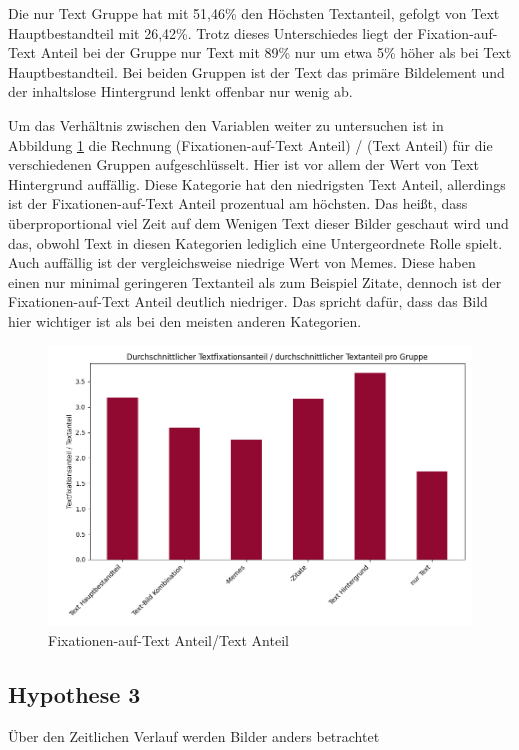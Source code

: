 \documentclass[
    language=german, %
    thesis=seminar, %
    supervisor=postdoc, %
    multiauthor=true, %
    ]{settings/csssa-thesis}
\begin{document}
Die nur Text Gruppe hat mit 51,46\% den Höchsten Textanteil, gefolgt von Text Hauptbestandteil 
mit 26,42\%. Trotz dieses Unterschiedes liegt der Fixation-auf-Text Anteil bei der Gruppe 
nur Text mit 89\% nur um etwa 5\% höher als bei Text Hauptbestandteil. Bei beiden Gruppen ist der 
Text das primäre Bildelement und der inhaltslose Hintergrund lenkt offenbar nur wenig ab. 

Um das Verhältnis zwischen den Variablen weiter zu untersuchen ist in Abbildung \ref{fig:bild25} die Rechnung 
(Fixationen-auf-Text Anteil) / (Text Anteil) für die verschiedenen Gruppen aufgeschlüsselt. 
Hier ist vor allem der Wert von Text Hintergrund auffällig. Diese Kategorie hat den niedrigsten 
Text Anteil, allerdings ist der Fixationen-auf-Text Anteil prozentual am höchsten. Das heißt, 
dass überproportional viel Zeit auf dem Wenigen Text dieser Bilder geschaut wird und das, 
obwohl Text in diesen Kategorien lediglich eine Untergeordnete Rolle spielt. Auch auffällig 
ist der vergleichsweise niedrige Wert von Memes. Diese haben einen nur minimal geringeren 
Textanteil als zum Beispiel Zitate, dennoch ist der Fixationen-auf-Text Anteil deutlich niedriger. 
Das spricht dafür, dass das Bild hier wichtiger ist als bei den meisten anderen Kategorien.

\begin{figure}[h]
    \centering
    \includegraphics[width=\linewidth,height=0.8\textheight,keepaspectratio]{figures/Bild30.png}
    \caption{Fixationen-auf-Text Anteil/Text Anteil}\label{fig:bild25}
\end{figure}

\subsection{Hypothese 3}
Über den Zeitlichen Verlauf werden Bilder anders betrachtet
\end{document}
